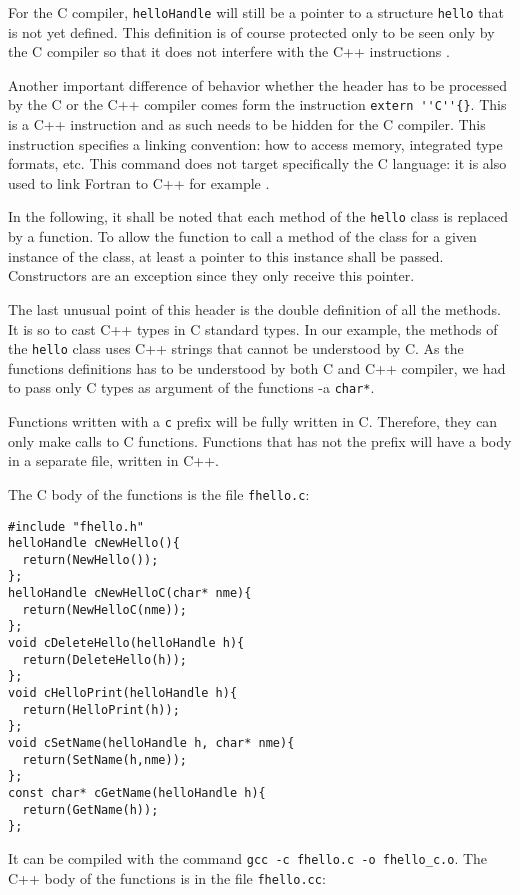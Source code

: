 \documentclass[A4paper]{article}
\begin{document}
For the C compiler, \verb|helloHandle| will still be a pointer to a structure
\verb|hello| that is not yet defined. This definition is of course protected
only to be seen only by the C compiler so that it does not interfere with the
C++ instructions \cite{Rudy2006}.

Another important difference of behavior whether the header has to be
processed by the C or the C++ compiler comes form the instruction 
\verb|extern ''C''{}|. This is a C++ instruction and as such needs to be
hidden for the C compiler. This instruction specifies a linking convention:
how to access memory, integrated type formats, etc. This command does not
target specifically the C language: it is also used to link Fortran to C++ for
example \cite{C++}.

In the following, it shall be noted that each method of the \verb|hello| class
is replaced by a function. To allow the function to call a method of the class
for a given instance of the class, at least a pointer to this instance shall
be passed. Constructors are an exception since they only receive this pointer.

The last unusual point of this header is the double definition of all the
methods. It is so to cast C++ types in C standard types. In our example, the
methods of the \verb|hello| class uses C++ strings that cannot be understood
by C. As the functions definitions has to be understood by both C and C++
compiler, we had to pass only C types as argument of the functions -a
\verb|char*|. 

Functions written with a \verb|c| prefix will be fully
written in C. Therefore, they can only make calls to C functions. Functions
that has not the prefix will have a body in a separate file, written in C++.

The C body of the functions is the file \verb|fhello.c|:

\begin{verbatim}
#include "fhello.h"
helloHandle cNewHello(){
  return(NewHello());
};
helloHandle cNewHelloC(char* nme){
  return(NewHelloC(nme));
};
void cDeleteHello(helloHandle h){
  return(DeleteHello(h));
};
void cHelloPrint(helloHandle h){
  return(HelloPrint(h));
};
void cSetName(helloHandle h, char* nme){
  return(SetName(h,nme));
};
const char* cGetName(helloHandle h){
  return(GetName(h));
};

\end{verbatim}

It can be compiled with the command \verb|gcc -c fhello.c -o fhello_c.o|. The
C++ body of the functions is in the file \verb|fhello.cc|:
\end{document}
